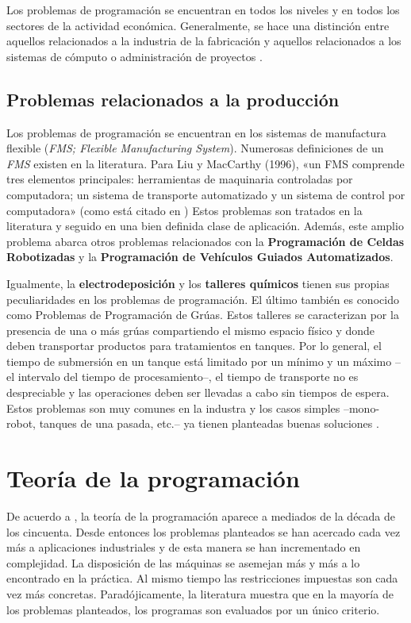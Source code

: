\documentclass[draft,12pt,headsepline,footsepline,paper=letter]{scrreprt}
\begin{document}
Los problemas de programación se encuentran en todos los niveles y en todos los sectores de la actividad económica. Generalmente, se hace una distinción entre aquellos relacionados a la industria de la fabricación y aquellos relacionados a los sistemas de cómputo o administración de proyectos \citep[p.~6]{TKindt2002}.

\subsection{Problemas relacionados a la producción} %
\label{problemas_relacionados_produccion}

Los problemas de programación se encuentran en los sistemas de manufactura flexible (\textit{FMS; Flexible Manufacturing System}). Numerosas definiciones de un \textit{FMS} existen en la literatura. Para Liu y MacCarthy (1996), «un FMS comprende tres elementos principales: herramientas de maquinaria controladas por computadora; un sistema de transporte automatizado y un sistema de control por computadora» (como está citado en \citealp[p.~6]{TKindt2002})  Estos problemas son tratados en la literatura y seguido en una bien definida clase de aplicación. Además, este amplio problema abarca otros problemas relacionados con la \textbf{Programación de Celdas Robotizadas} y la \textbf{Programación de Vehículos Guiados Automatizados}.

Igualmente, la \textbf{electrodeposición} y los \textbf{talleres químicos} tienen sus propias peculiaridades en los problemas de programación. El último también es conocido como Problemas de Programación de Grúas. Estos talleres se caracterizan por la presencia de una o más grúas compartiendo el mismo espacio físico y donde deben transportar productos para tratamientos en tanques. Por lo general, el tiempo de submersión en un tanque está limitado por un mínimo y un máximo –el intervalo del tiempo de procesamiento–, el tiempo de transporte no es despreciable y las operaciones deben ser llevadas a cabo sin tiempos de espera. Estos problemas son muy comunes en la industra y los casos simples –mono-robot, tanques de una pasada, etc.– ya tienen planteadas buenas soluciones \citep[p.~6,~7]{TKindt2002}.


\section{Teoría de la programación}
\label{teoria_programacion}

De acuerdo a \citet[p.~1]{TKindt2002}, la teoría de la programación aparece a mediados de la década de los cincuenta. Desde entonces los problemas planteados se han acercado cada vez más a aplicaciones industriales y de esta manera se han incrementado en complejidad. La disposición de las máquinas se asemejan más y más a lo encontrado en la práctica. Al mismo tiempo las restricciones impuestas son cada vez más concretas.  Paradójicamente, la literatura muestra que en la mayoría de los problemas planteados, los programas son evaluados por un único criterio. 
\end{document}
